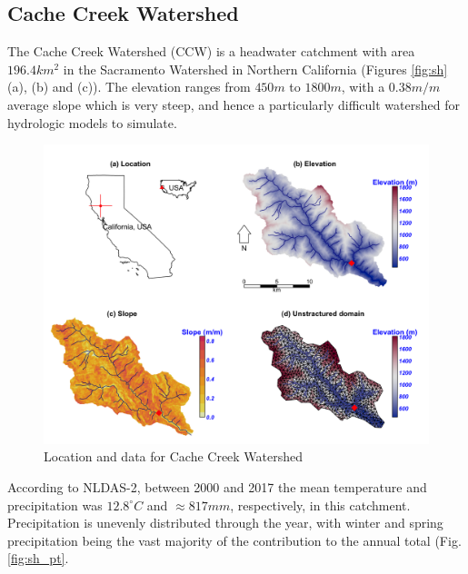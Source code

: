 \documentclass[
]{scrbook}
\begin{document}
\hypertarget{cache-creek-watershed}{%
\subsection{Cache Creek Watershed}\label{cache-creek-watershed}}

The Cache Creek Watershed (CCW) is a headwater catchment with area \(196.4 km^2\) in the Sacramento Watershed in Northern California (Figures \ref{fig:sh} (a), (b) and (c)). The elevation ranges from \(450 m\) to \(1800 m\), with a \(0.38 m/m\) average slope which is very steep, and hence a particularly difficult watershed for hydrologic models to simulate.

\begin{figure}
\centering
\includegraphics{Fig/Example/CacheCreek/sac5_map.png}
\caption{Location and data for Cache Creek Watershed}
\end{figure}

According to NLDAS-2, between 2000 and 2017 the mean temperature and precipitation was \(12.8 ^\circ C\) and \(\approx 817 mm\), respectively, in this catchment. Precipitation is unevenly distributed through the year, with winter and spring precipitation being the vast majority of the contribution to the annual total (Fig. \ref{fig:sh_pt}.
\end{document}
